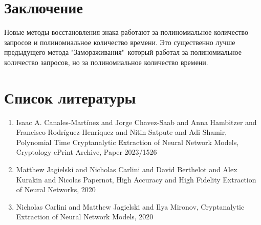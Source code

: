 \section{Заключение}
Новые методы восстановления знака работают за полиномиальное количество запросов и полиномиальное количество времени. Это существенно лучше предыдущего метода "Замораживания"\, который работал за полиномиальное количество запросов, но за полиномиальное количество времени.

\section{Список литературы}
\begin{enumerate}
	\item Isaac A. Canales-Martínez and Jorge Chavez-Saab and Anna Hambitzer and Francisco Rodríguez-Henríquez and Nitin Satpute and Adi Shamir, Polynomial Time Cryptanalytic Extraction of Neural Network Models, Cryptology ePrint Archive, Paper 2023/1526
	\item Matthew Jagielski and Nicholas Carlini and David Berthelot and Alex Kurakin and Nicolas Papernot, High Accuracy and High Fidelity Extraction of Neural Networks, 2020
	\item Nicholas Carlini and Matthew Jagielski and Ilya Mironov, Cryptanalytic Extraction of Neural Network Models, 2020

\end{enumerate}